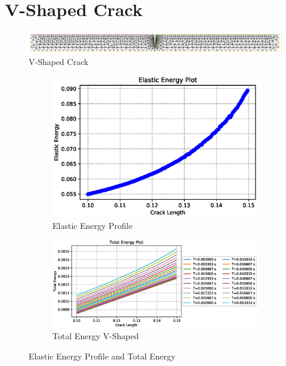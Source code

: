 \documentclass[a4paper,11pt]{article}
\begin{document}
\section{V-Shaped Crack}
\begin{figure}[h!]
	\centering
	\includegraphics[width=\linewidth]{picture/conference/cracked-vshape}
	\caption{V-Shaped Crack}
	\label{fig:vshaped-mesh}
\end{figure}
\begin{figure}[h!]
	\begin{subfigure}[b]{0.5\linewidth}
		\centering
		\includegraphics[width=\linewidth]{picture/conference/elastic-vshape}
		\caption{Elastic Energy Profile}
		\label{fig:vshaped-elastic}
	\end{subfigure}
	\quad
	\begin{subfigure}[b]{0.5\linewidth}
		\centering
		\includegraphics[width=\linewidth]{picture/conference/totalenergy-vshape}
		\caption{Total Energy V-Shaped}
		\label{fig:totalenergy-vshaped}
	\end{subfigure}
	\caption{Elastic Energy Profile and Total Energy}
	\label{fig:totalelastic-vshaped}
\end{figure}
\end{document}
